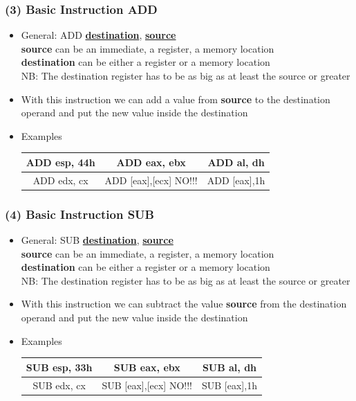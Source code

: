 \documentclass[]{beamer}
\begin{document}
		\begin{frame}
			\frametitle{(3) Basic Instruction ADD}
			\begin{itemize}
					\item{General: ADD \underline{\textbf{destination}}, \underline{\textbf{source}}}\\
					\textbf{source} can be an immediate, a register, a memory location\\
					\textbf{destination} can be either a register or a memory location\\
					NB: The destination register has to be as big as at least the source or greater 
					\item{With this instruction we can add a value from \textbf{source}  to the destination operand and put the new value inside the destination}
					\item{Examples}
					\begin{table}[h]
						\begin{tabular}{|c|c|c|}
							\hline
							ADD esp, 44h&ADD eax, ebx&ADD al, dh\\
							\hline
							ADD  edx, cx&ADD [eax],[ecx] \color{red}NO!!!&ADD [eax],1h\\
							\hline
						\end{tabular}
					\end{table}

			\end{itemize}
		\end{frame}
		\begin{frame}
			\frametitle{(4) Basic Instruction SUB}
			\begin{itemize}
				\item{General: SUB \underline{\textbf{destination}}, \underline{\textbf{source}}}\\
				\textbf{source} can be an immediate, a register, a memory location\\
				\textbf{destination} can be either a register or a memory location\\
					NB: The destination register has to be as big as at least the source or greater 
				\item{With this instruction we can subtract the value \textbf{source}  from the destination operand and put the new value inside the destination}

				\item{Examples}
					\begin{table}[h]
						\begin{tabular}{|c|c|c|}
							\hline
							SUB esp, 33h&SUB eax, ebx&SUB al, dh\\
							\hline
							SUB edx, cx&SUB [eax],[ecx] \color{red}NO!!!&SUB [eax],1h\\
							\hline
						\end{tabular}
					\end{table}

			\end{itemize}
		\end{frame}
\end{document}
